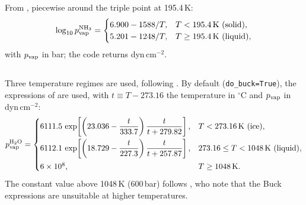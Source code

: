 \documentclass[11pt,a4paper]{article}
\newcommand{\code}[1]{\texttt{#1}}
\newcommand{\pvap}{p_{\rm vap}}
\newcommand{\chem}[1]{\mathrm{#1}}
\begin{document}
\subsection{\texorpdfstring{\chem{NH_3}}{NH3}}
From \citet{lodders1998}, piecewise around the triple point at 195.4\,K:
\begin{equation}
  \log_{10} \pvap^{\rm NH_3} =
  \begin{cases}
    6.900 - 1588/T, & T < 195.4\,\mathrm{K}\ \text{(solid)},\\
    5.201 - 1248/T, & T \ge 195.4\,\mathrm{K}\ \text{(liquid)},
  \end{cases}
\end{equation}
with $\pvap$ in bar; the code returns dyn\,cm$^{-2}$.

\subsection{\texorpdfstring{\chem{H_2O}}{H2O}}
Three temperature regimes are used, following \citet{ackerman2001}.
By default (\code{do\_buck=True}), the expressions of \citet{buck1981} are
used, with $t \equiv T - 273.16$ the temperature in $^\circ$C and $\pvap$ in
dyn\,cm$^{-2}$:
\begin{equation}
  \pvap^{\rm H_2O} =
  \begin{cases}
    6111.5\,\exp\!\left[\left(23.036 - \dfrac{t}{333.7}\right)\dfrac{t}{t + 279.82}\right],
      & T < 273.16\,\mathrm{K}\ \text{(ice)},\\[2ex]
    6112.1\,\exp\!\left[\left(18.729 - \dfrac{t}{227.3}\right)\dfrac{t}{t + 257.87}\right],
      & 273.16 \le T < 1048\,\mathrm{K}\ \text{(liquid)},\\[2ex]
    6\times10^{8}, & T \ge 1048\,\mathrm{K}.
  \end{cases}
\end{equation}
The constant value above 1048\,K (600\,bar) follows \citet{ackerman2001},
who note that the Buck expressions are unsuitable at higher temperatures.
\end{document}
